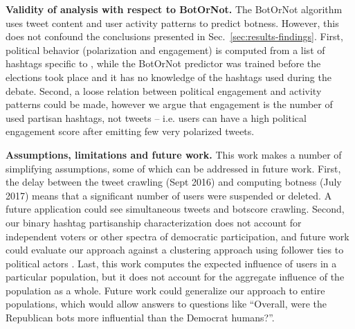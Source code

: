 %
%
%
%
%
\textbf{Validity of analysis with respect to BotOrNot.}
The BotOrNot algorithm uses tweet content and user activity patterns to predict botness.
However, this does not confound the conclusions presented in Sec.~\ref{sec:results-findings}.
First, political behavior (polarization and engagement) is computed from a list of hashtags specific to \debate, while the BotOrNot predictor was trained before the elections took place and it has no knowledge of the hashtags used during the debate.
Second, a loose relation between political engagement and activity patterns could be made, however we argue that engagement is the number of used partisan hashtags, not tweets -- i.e. users can have a high political engagement score after emitting few very polarized tweets.

\textbf{Assumptions, limitations and future work.}
This work makes a number of simplifying assumptions, some of which can be addressed in future work.
First, the delay between the tweet crawling (Sept 2016) and computing botness (July 2017) means that a significant number of users were suspended or deleted.
A future application could see simultaneous tweets and botscore crawling.
Second, our binary hashtag partisanship characterization does not account for independent voters or other spectra of democratic participation, and future work could evaluate our approach against a clustering approach using follower ties to political actors \cite{barbera.2015}.
Last, this work computes the expected influence of users in a particular population, but it does not account for the aggregate influence of the population as a whole.
Future work could generalize our approach to entire populations, which would allow answers to questions like ``Overall, were the Republican bots more influential than the Democrat humans?''.

